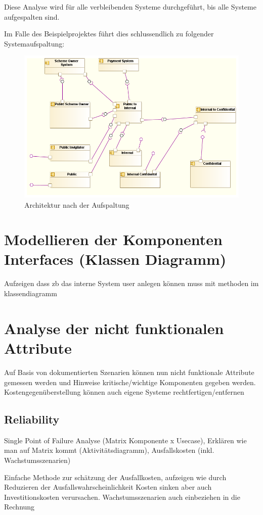 Diese Analyse wird für alle verbleibenden Systeme durchgeführt, bis alle Systeme aufgespalten sind.

Im Falle des Beispielprojektes führt dies schlussendlich zu folgender Systemaufspaltung:

\begin{figure}[H]
    \centering
    \includegraphics[scale=0.6]{uml/vision4.png}
    \caption{Architektur nach der Aufspaltung }
\end{figure}


\section{Modellieren der Komponenten Interfaces (Klassen Diagramm)}
Aufzeigen dass zb das interne System user anlegen können muss mit methoden im klassendiagramm

\section{Analyse der nicht funktionalen Attribute}
Auf Basis von dokumentierten Szenarien können nun nicht funktionale Attribute gemessen werden und Hinweise kritische/wichtige Komponenten gegeben werden. Kostengegenüberstellung können auch eigene Systeme rechtfertigen/entfernen

\subsection{Reliability}
Single Point of Failure Analyse (Matrix Komponente x Usecase), Erklären wie man auf Matrix kommt (Aktivitätsdiagramm), Ausfallskosten (inkl. Wachstumsszenarien)

Einfache Methode zur schätzung der Ausfallkosten, aufzeigen wie durch Reduzieren der Ausfallswahrscheinlichkeit Kosten sinken aber auch Investitionskosten verursachen. Wachstumsszenarien auch einbeziehen in die Rechnung
